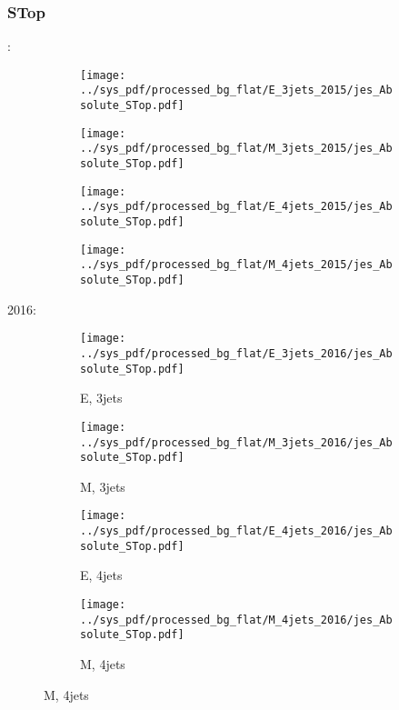 \documentclass{beamer}
\begin{document}
\begin{frame}
\frametitle{STop}
\fontsize{5}{1}:
\begin{figure}
\centering
\begin{subfigure}[b]{0.24\textwidth}
\texttt{[image: ../sys\_pdf/processed\_bg\_flat/E\_3jets\_2015/jes\_Absolute\_STop.pdf]}
\end{subfigure}
\begin{subfigure}[b]{0.24\textwidth}
\texttt{[image: ../sys\_pdf/processed\_bg\_flat/M\_3jets\_2015/jes\_Absolute\_STop.pdf]}
\end{subfigure}
\begin{subfigure}[b]{0.24\textwidth}
\texttt{[image: ../sys\_pdf/processed\_bg\_flat/E\_4jets\_2015/jes\_Absolute\_STop.pdf]}
\end{subfigure}
\begin{subfigure}[b]{0.24\textwidth}
\texttt{[image: ../sys\_pdf/processed\_bg\_flat/M\_4jets\_2015/jes\_Absolute\_STop.pdf]}
\end{subfigure}
\end{figure}
2016:
\begin{figure}
\centering
\begin{subfigure}[b]{0.24\textwidth}
\texttt{[image: ../sys\_pdf/processed\_bg\_flat/E\_3jets\_2016/jes\_Absolute\_STop.pdf]}
\captionsetup{font=tiny}
\caption{E, 3jets}
\end{subfigure}
\begin{subfigure}[b]{0.24\textwidth}
\texttt{[image: ../sys\_pdf/processed\_bg\_flat/M\_3jets\_2016/jes\_Absolute\_STop.pdf]}
\captionsetup{font=tiny}
\caption{M, 3jets}
\end{subfigure}
\begin{subfigure}[b]{0.24\textwidth}
\texttt{[image: ../sys\_pdf/processed\_bg\_flat/E\_4jets\_2016/jes\_Absolute\_STop.pdf]}
\captionsetup{font=tiny}
\caption{E, 4jets}
\end{subfigure}
\begin{subfigure}[b]{0.24\textwidth}
\texttt{[image: ../sys\_pdf/processed\_bg\_flat/M\_4jets\_2016/jes\_Absolute\_STop.pdf]}
\captionsetup{font=tiny}
\caption{M, 4jets}
\end{subfigure}
\end{figure}
\end{frame}
\end{document}
